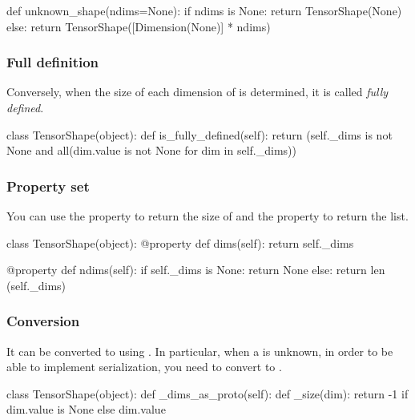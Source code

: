 \begin{content}
\begin{leftbar}
\begin{python}
def unknown_shape(ndims=None):
  if ndims is None:
    return TensorShape(None)
  else:
    return TensorShape([Dimension(None)] * ndims)
\end{python}
\end{leftbar}


\subsubsection{Full definition}
Conversely, when the size of each dimension of  is determined, it is called \emph{fully defined}.

\begin{leftbar}
\begin{python}
class TensorShape(object):
  def is_fully_defined(self):
    return (self._dims is not None and all(dim.value is not None
                                           for dim in self._dims))
\end{python}
\end{leftbar}


\subsubsection{Property set}
You can use the  property to return the  size of  and the  property to return the  list.

\begin{leftbar}
\begin{python}
class TensorShape(object):
  @property
  def dims(self):
    return self._dims

  @property
  def ndims(self):
    if self._dims is None:
      return None
    else:
      return len (self._dims)
\end{python}
\end{leftbar}


\subsubsection{Conversion}
It can be converted to  using . In particular, when a  is unknown, in order to be able to implement serialization, you need to convert  to .

\begin{leftbar}
\begin{python}
class TensorShape(object):
  def _dims_as_proto(self): 
    def _size(dim):
      return -1 if dim.value is None else dim.value
    

\end{python}
\end{leftbar}
\end{content}
